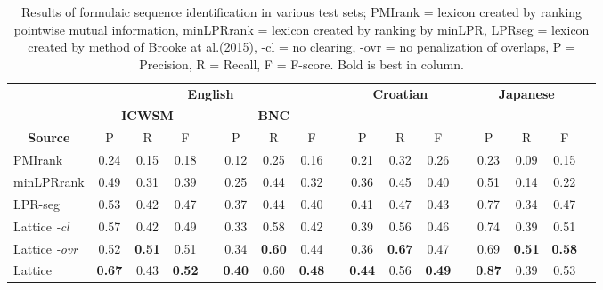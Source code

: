 \documentclass[11pt,letterpaper]{article}
\makeatletter
\def \al {al.\@ }
\makeatother
\begin{document}
 \begin{table}[!bt]
 
 \begin{center}
  \caption{ Results of formulaic sequence identification in various test sets; PMIrank = lexicon created by ranking pointwise mutual information, minLPRrank = lexicon created by ranking by minLPR, LPRseg = lexicon created by method of Brooke at \al (2015), -cl = no clearing, -ovr = no penalization of overlaps, P = Precision, R = Recall, F = F-score. Bold is best in column.}
	 \label{tab:main}
 \begin{tabular}{lcccccccccccccccc}

       \hline
        \hline
				& \multicolumn{7}{c}{\bf{English}} & & \multicolumn{3}{c}{\bf{Croatian}} & & \multicolumn{3}{c}{\bf{Japanese}} \\
       \cline{2-9}			
       & \multicolumn{3}{c}{\bf{ICWSM}} & &  \multicolumn{3}{c}{\bf{BNC}} & & &&&  && & \\
       \cline{2-4} \cline{6-8} \cline{10-12} \cline{14-16}
           \multicolumn{1}{c}{\bf{Source}}    & P & R & F &   & P & R & F &   & P & R & F &  & P & R & F \\
            \hline
           \hline     
           
PMIrank & 0.24& 0.15& 0.18 & & 0.12 & 0.25 & 0.16 & & 0.21 &0.32 & 0.26 & & 0.23& 0.09 & 0.15 \\ 
minLPRrank & 0.49& 0.31 & 0.39 & & 0.25& 0.44 & 0.32 & & 0.36 & 0.45 & 0.40 &  & 0.51 & 0.14 & 0.22 \\ 

LPR-seg  &0.53 & 0.42 & 0.47 && 0.37 & 0.44 & 0.40 & & 0.41 & 0.47  & 0.43 &  & 0.77 & 0.34 & 0.47 \\ 
  \hline 

	Lattice \emph{-cl} & 0.57& 0.42 & 0.49 & & 0.33& 0.58 & 0.42 & & 0.39 & 0.56 & 0.46 & & 0.74 & 0.39 & 0.51 \\  	 
			
	Lattice \emph{-ovr} & 0.52& \bf{0.51} & 0.51 & & 0.34& \bf{0.60} & 0.44& & 0.36 & \bf{0.67} & 0.47 & & 0.69 & \bf{0.51} & \bf{0.58} \\  
			
				Lattice & \bf{0.67} & 0.43 & \bf{0.52} & & \bf{0.40}& 0.60 & \bf{0.48} & &\bf{0.44} & 0.56 & \bf{0.49} & & \bf{0.87} & 0.39 & 0.53 \\ 
            \hline
           \hline                  

 \end{tabular}

 \end{center}


 \end{table}
\end{document}
